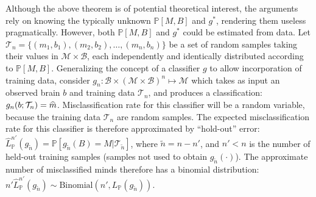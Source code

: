 \documentclass{article}
\newcommand{\mB}{\mathcal{B}}
\newcommand{\mM}{\mathcal{M}}
\newcommand{\PP}{\mathbb{P}}           %
\newcommand{\EE}{\mathbb{E}}           %
\providecommand{\mc}[1]{\mathcal{#1}}
\providecommand{\mh}[1]{\widehat{#1}}
\providecommand{\mt}[1]{\widetilde{#1}}
\newcommand{\hL}{\widehat{L}}
\providecommand{\tr}[1]{\textcolor{black}{#1}}
\begin{document}
Although the above theorem is of potential theoretical interest, the arguments rely on knowing the typically unknown $\PP[M,B]$ and $g^*$, rendering them useless pragmatically.  However, both $\PP[M,B]$ and $g^*$ could be estimated from data.  Let $\mc{T}_n=\{(m_1,b_1), (m_2,b_2), \ldots, (m_n,b_n)\}$ be a set of random samples taking their values in $\mc{M} \times \mc{B}$, each independently and identically distributed according to $\PP[M,B]$.  Generalizing the concept of a classifier $g$ to allow incorporation of training data, consider $g_n:\mB \times (\mc{M} \times \mc{B})^n \mapsto \mM$ which takes as input an observed brain  $b$ and training data $\mc{T}_n$, and produces a classification: $g_n(b;\tr{\mc{T}_n})=\mh{m}$.  Misclassification rate for this classifier will be a random variable, because the training data $\mc{T}_n$ are random samples.  The expected misclassification rate for this classifier is therefore approximated by ``hold-out'' error:
$\hL^{n'}_{\PP}(g_{\mt{n}}) = \PP[g_{\mt{n}}(B)=M | \mc{T}_{\mt{n}}]$,
where $\mt{n}=n-n'$, and $n'<n$ is the number of held-out training samples (samples not used to obtain $g_{\mt{n}}(\cdot)$).
The approximate  number of misclassified minds
therefore
has a binomial distribution:  $n' \hL^{n'}_{\PP}(g_{\mt{n}}) \sim \text{Binomial}(n',L_{\PP}(g_{\mt{n}}))$. %
\end{document}
